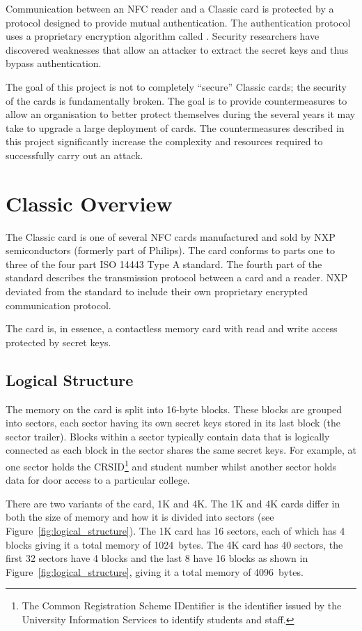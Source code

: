 \documentclass[final,dissertation.tex]{subfiles}
\begin{document}
  Communication between an NFC reader and a \mifare{} Classic card is protected by a protocol designed to provide mutual authentication. The authentication protocol uses a proprietary encryption algorithm called \crypto{}. Security researchers have discovered weaknesses that allow an attacker to extract the secret keys and thus bypass authentication.

  The goal of this project is not to completely ``secure'' \mifare{} Classic cards; the security of the cards is fundamentally broken. The goal is to provide countermeasures to allow an organisation to better protect themselves during the several years it may take to upgrade a large deployment of cards. The countermeasures described in this project significantly increase the complexity and resources required to successfully carry out an attack.

  \section{\mifare{} Classic Overview}

  The \mifare{} Classic card is one of several NFC cards manufactured and sold by NXP semiconductors (formerly part of Philips). The card conforms to parts one to three of the four part ISO 14443 Type A standard. The fourth part of the standard describes the transmission protocol between a card and a reader. NXP deviated from the standard to include their own proprietary encrypted communication protocol.

  The card is, in essence, a contactless memory card with read and write access protected by secret keys.

  \subsection{Logical Structure}
  The memory on the card is split into 16-byte blocks. These blocks are grouped into sectors, each sector having its own secret keys stored in its last block (the sector trailer). Blocks within a sector typically contain data that is logically connected as each block in the sector shares the same secret keys. For example, at \UoC{} one sector holds the CRSID\footnote{The Common Registration Scheme IDentifier is the identifier issued by the University Information Services to identify students and staff.} and student number whilst another sector holds data for door access to a particular college.

  There are two variants of the card, 1K and 4K. The 1K and 4K cards differ in both the size of memory and how it is divided into sectors (see Figure~\vref{fig:logical_structure}). The 1K card has 16 sectors, each of which has 4 blocks giving it a total memory of \SI{1024}{bytes}. The 4K card has 40 sectors, the first 32 sectors have 4 blocks and the last 8 have 16 blocks as shown in Figure~\vref{fig:logical_structure}, giving it a total memory of \SI{4096}{bytes}.
\end{document}
